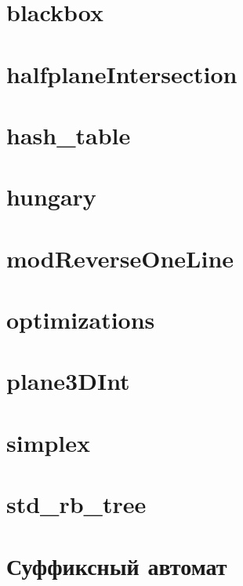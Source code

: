 \documentclass[portrait,twocolumn,letterpaper]{article}
\begin{document}
\section{blackbox}


\section{halfplaneIntersection}


\section{hash\_table}


\section{hungary}


\section{modReverseOneLine}


\section{optimizations}


\section{plane3DInt}


\section{simplex}


\section{std\_rb\_tree}

 
\section{Суффиксный автомат}

\end{document}
